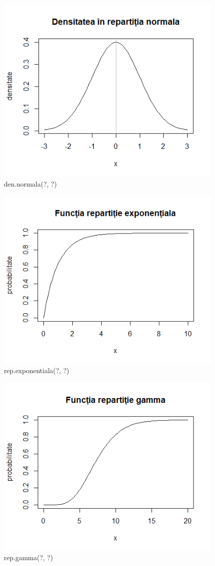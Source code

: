 \documentclass[12pt]{article}
\begin{document}
	\begin{figure}[h!]
		\centering		
		\includegraphics[scale=0.75]{DenNorm}
		\caption{den.normala(?, ?)}
	\end{figure}

	\begin{figure}
		\centering
		\includegraphics[scale=0.75]{RepExp}
		\caption{rep.exponentiala(?, ?)}	
	\end{figure}

	\begin{figure}
		\centering
		\includegraphics[scale=0.75]{RepGamma}
		\caption{rep.gamma(?, ?)}	
	\end{figure}
	
\end{document}
